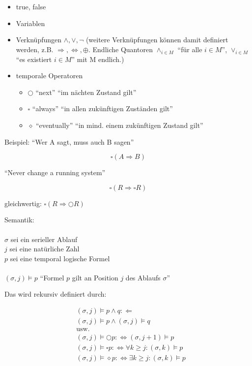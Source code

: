 \begin{itemize}
	\item true, false
	\item Variablen
	\item Verknüpfungen $ \wedge, \vee, \neg $ (weitere Verknüpfungen können damit definiert werden, z.B. $ \Rightarrow, \Leftrightarrow, \oplus $. Endliche Quantoren $ \wedge_{i \in M} $ "`für alle $ i \in M $"', $ \vee_{i \in M} $ "`es existiert $ i \in M $"' mit M endlich.)
	\item temporale Operatoren
	\begin{itemize}
		\item $ \bigcirc $ "`next"' "`im nächten Zustand gilt"'
		\item $ \square $ "`always"' "`in allen zukünftigen Zuständen gilt"'
		\item $ \diamond $ "`eventually"' "`in mind. einem zukünftigen Zustand gilt"' 
	\end{itemize}
\end{itemize}

Beispiel: "`Wer A sagt, muss auch B sagen"'

\begin{equation*}
\square (A \Rightarrow B)
\end{equation*}

"`Never change a running system"'

\begin{equation*}
\square (R \Rightarrow \square R)
\end{equation*}

gleichwertig: $ \square (R \Rightarrow \bigcirc R) $

Semantik:\\
\\
$ \sigma $ sei ein serieller Ablauf\\
$ j $ sei eine natürliche Zahl\\
$ p $ sei eine temporal logische Formel\\
\\ %
$ (\sigma, j) \models p $ "`Formel $ p $ gilt an Position $ j $ des Ablaufs $ \sigma $"'

Das wird rekursiv definiert durch:

\begin{align*}
& (\sigma, j) \models p \wedge q : \Leftarrow\\
& (\sigma, j) \models p \wedge (\sigma, j) \models q\\
& \text{usw.} \\ %
& (\sigma, j) \models \bigcirc p : \Leftrightarrow (\sigma, j + 1) \models p\\
& (\sigma, j) \models \square p : \Leftrightarrow \forall k \geq j: (\sigma, k) \models p\\
& (\sigma, j) \models \diamond p : \Leftrightarrow \exists k \geq j: (\sigma, k) \models p
\end{align*}

